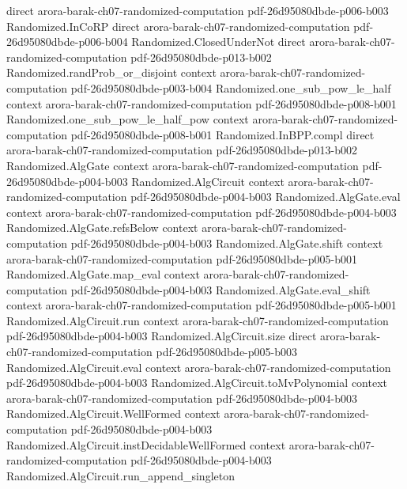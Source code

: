 \begin{theorem}
  {direct}
  {arora-barak-ch07-randomized-computation}
  {pdf-26d95080dbde-p006-b003}
\proofstep
  {Randomized.InCoRP}
  {direct}
  {arora-barak-ch07-randomized-computation}
  {pdf-26d95080dbde-p006-b004}
\proofstep
  {Randomized.ClosedUnderNot}
  {direct}
  {arora-barak-ch07-randomized-computation}
  {pdf-26d95080dbde-p013-b002}
\proofstep
  {Randomized.randProb_or_disjoint}
  {context}
  {arora-barak-ch07-randomized-computation}
  {pdf-26d95080dbde-p003-b004}
\proofstep
  {Randomized.one_sub_pow_le_half}
  {context}
  {arora-barak-ch07-randomized-computation}
  {pdf-26d95080dbde-p008-b001}
\proofstep
  {Randomized.one_sub_pow_le_half_pow}
  {context}
  {arora-barak-ch07-randomized-computation}
  {pdf-26d95080dbde-p008-b001}
\proofstep
  {Randomized.InBPP.compl}
  {direct}
  {arora-barak-ch07-randomized-computation}
  {pdf-26d95080dbde-p013-b002}
\proofstep
  {Randomized.AlgGate}
  {context}
  {arora-barak-ch07-randomized-computation}
  {pdf-26d95080dbde-p004-b003}
\proofstep
  {Randomized.AlgCircuit}
  {context}
  {arora-barak-ch07-randomized-computation}
  {pdf-26d95080dbde-p004-b003}
\proofstep
  {Randomized.AlgGate.eval}
  {context}
  {arora-barak-ch07-randomized-computation}
  {pdf-26d95080dbde-p004-b003}
\proofstep
  {Randomized.AlgGate.refsBelow}
  {context}
  {arora-barak-ch07-randomized-computation}
  {pdf-26d95080dbde-p004-b003}
\proofstep
  {Randomized.AlgGate.shift}
  {context}
  {arora-barak-ch07-randomized-computation}
  {pdf-26d95080dbde-p005-b001}
\proofstep
  {Randomized.AlgGate.map_eval}
  {context}
  {arora-barak-ch07-randomized-computation}
  {pdf-26d95080dbde-p004-b003}
\proofstep
  {Randomized.AlgGate.eval_shift}
  {context}
  {arora-barak-ch07-randomized-computation}
  {pdf-26d95080dbde-p005-b001}
\proofstep
  {Randomized.AlgCircuit.run}
  {context}
  {arora-barak-ch07-randomized-computation}
  {pdf-26d95080dbde-p004-b003}
\proofstep
  {Randomized.AlgCircuit.size}
  {direct}
  {arora-barak-ch07-randomized-computation}
  {pdf-26d95080dbde-p005-b003}
\proofstep
  {Randomized.AlgCircuit.eval}
  {context}
  {arora-barak-ch07-randomized-computation}
  {pdf-26d95080dbde-p004-b003}
\proofstep
  {Randomized.AlgCircuit.toMvPolynomial}
  {context}
  {arora-barak-ch07-randomized-computation}
  {pdf-26d95080dbde-p004-b003}
\proofstep
  {Randomized.AlgCircuit.WellFormed}
  {context}
  {arora-barak-ch07-randomized-computation}
  {pdf-26d95080dbde-p004-b003}
\proofstep
  {Randomized.AlgCircuit.instDecidableWellFormed}
  {context}
  {arora-barak-ch07-randomized-computation}
  {pdf-26d95080dbde-p004-b003}
\proofstep
  {Randomized.AlgCircuit.run_append_singleton}

\end{theorem}
